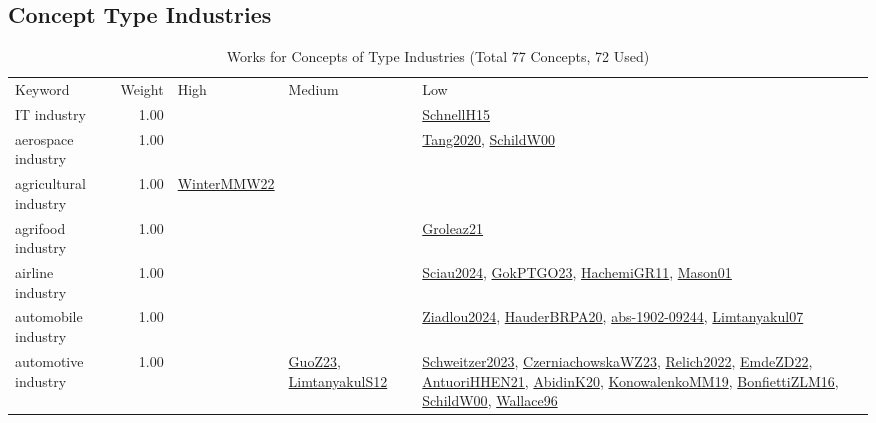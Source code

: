 \subsection{Concept Type Industries}
\label{sec:Industries}
\label{Industries}
{\scriptsize
\begin{longtable}{p{3cm}r>{\raggedright\arraybackslash}p{6cm}>{\raggedright\arraybackslash}p{6cm}>{\raggedright\arraybackslash}p{8cm}}
\rowcolor{white}\caption{Works for Concepts of Type Industries (Total 77 Concepts, 72 Used)}\\ \toprule
\rowcolor{white}Keyword & Weight & High & Medium & Low\\ \midrule\endhead
\bottomrule
\endfoot
\index{IT industry}\index{Industries!IT industry}IT industry &  1.00 &  &  & \hyperref[detail:SchnellH15]{SchnellH15}\\
\index{aerospace industry}\index{Industries!aerospace industry}aerospace industry &  1.00 &  &  & \hyperref[detail:Tang2020]{Tang2020}, \hyperref[detail:SchildW00]{SchildW00}\\
\index{agricultural industry}\index{Industries!agricultural industry}agricultural industry &  1.00 & \hyperref[detail:WinterMMW22]{WinterMMW22} &  & \\
\index{agrifood industry}\index{Industries!agrifood industry}agrifood industry &  1.00 &  &  & \hyperref[detail:Groleaz21]{Groleaz21}\\
\index{airline industry}\index{Industries!airline industry}airline industry &  1.00 &  &  & \hyperref[detail:Sciau2024]{Sciau2024}, \hyperref[detail:GokPTGO23]{GokPTGO23}, \hyperref[detail:HachemiGR11]{HachemiGR11}, \hyperref[detail:Mason01]{Mason01}\\
\index{automobile industry}\index{Industries!automobile industry}automobile industry &  1.00 &  &  & \hyperref[detail:Ziadlou2024]{Ziadlou2024}, \hyperref[detail:HauderBRPA20]{HauderBRPA20}, \hyperref[detail:abs-1902-09244]{abs-1902-09244}, \hyperref[detail:Limtanyakul07]{Limtanyakul07}\\
\index{automotive industry}\index{Industries!automotive industry}automotive industry &  1.00 &  & \hyperref[detail:GuoZ23]{GuoZ23}, \hyperref[detail:LimtanyakulS12]{LimtanyakulS12} & \hyperref[detail:Schweitzer2023]{Schweitzer2023}, \hyperref[detail:CzerniachowskaWZ23]{CzerniachowskaWZ23}, \hyperref[detail:Relich2022]{Relich2022}, \hyperref[detail:EmdeZD22]{EmdeZD22}, \hyperref[detail:AntuoriHHEN21]{AntuoriHHEN21}, \hyperref[detail:AbidinK20]{AbidinK20}, \hyperref[detail:KonowalenkoMM19]{KonowalenkoMM19}, \hyperref[detail:BonfiettiZLM16]{BonfiettiZLM16}, \hyperref[detail:SchildW00]{SchildW00}, \hyperref[detail:Wallace96]{Wallace96}\\

\end{longtable}}
